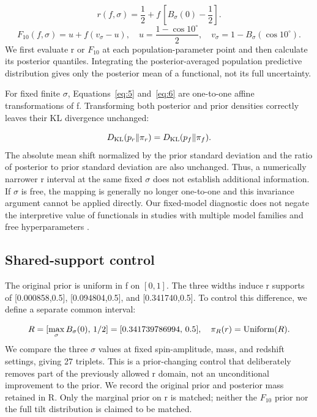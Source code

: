 \documentclass[a4paper,11pt]{article}
\begin{document}
\begin{equation}\label{eq:5}
r(f,\sigma)=\frac{1}{2}+f\,[B_\sigma(0)-\frac{1}{2}].
\end{equation}
\begin{equation}\label{eq:6}
F_{10}(f,\sigma)=u+f(v_\sigma-u),\quad u=\frac{1-\cos10^\circ}{2},\quad v_\sigma=1-B_\sigma(\cos10^\circ).
\end{equation}
We first evaluate r or \(F_{10}\) at each population-parameter point and then calculate its posterior quantiles. Integrating the posterior-averaged population predictive distribution gives only the posterior mean of a functional, not its full uncertainty.

For fixed finite \(\sigma\), Equations~\eqref{eq:5} and~\eqref{eq:6} are one-to-one affine transformations of f. Transforming both posterior and prior densities correctly leaves their KL divergence unchanged:

\begin{equation}\label{eq:7}
D_{\rm KL}(p_r\Vert\pi_r)=D_{\rm KL}(p_f\Vert\pi_f).
\end{equation}
The absolute mean shift normalized by the prior standard deviation and the ratio of posterior to prior standard deviation are also unchanged. Thus, a numerically narrower r interval at the same fixed \(\sigma\) does not establish additional information. If \(\sigma\) is free, the mapping is generally no longer one-to-one and this invariance argument cannot be applied directly. Our fixed-model diagnostic does not negate the interpretive value of functionals in studies with multiple model families and free hyperparameters \cite{ref5}.

\subsection{Shared-support control}\label{sec:4.2}
The original prior is uniform in f on \([0,1]\). The three widths induce r supports of [0.000858,0.5], [0.094804,0.5], and [0.341740,0.5]. To control this difference, we define a separate common interval:

\begin{equation}\label{eq:8}
R=[\max_\sigma B_\sigma(0),\,1/2]=[0.341739786994,\,0.5],\quad \pi_R(r)={\rm Uniform}(R).
\end{equation}
We compare the three \(\sigma\) values at fixed spin-amplitude, mass, and redshift settings, giving 27 triplets. This is a prior-changing control that deliberately removes part of the previously allowed r domain, not an unconditional improvement to the prior. We record the original prior and posterior mass retained in R. Only the marginal prior on r is matched; neither the \(F_{10}\) prior nor the full tilt distribution is claimed to be matched.
\end{document}
